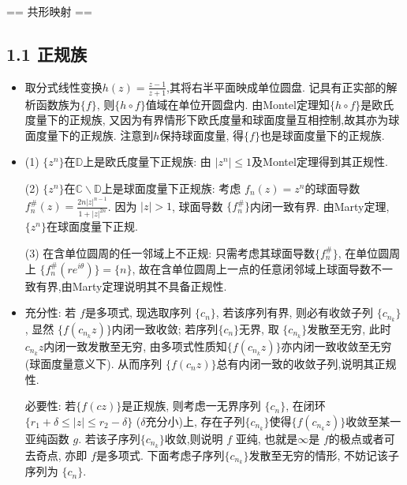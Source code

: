 \renewcommand{\Re}{\operatorname{Re}}
\renewcommand{\Im}{\operatorname{Im}}
\newcommand{\tmod}{\operatorname{mod}}

== 共形映射 ==

\subsection*{1.1 正规族}

\begin{itemize}
    \item[1.1.1]
取分式线性变换$h(z) = \frac{z-1}{z+1}$,其将右半平面映成单位圆盘.
记具有正实部的解析函数族为$\{f\}$, 则$\{h\circ f\}$值域在单位开圆盘内. 
由Montel定理知$\{h\circ f\}$是欧氏度量下的正规族, 
又因为有界情形下欧氏度量和球面度量互相控制,故其亦为球面度量下的正规族.
注意到$h$保持球面度量, 得$\{f\}$也是球面度量下的正规族.


    \item[1.1.2]

(1) $\{z^n\}$在$\mathbb{D}$上是欧氏度量下正规族:
由 $|z^n|\le 1$及Montel定理得到其正规性.

(2) $\{z^n\}$在$\mathbb{C}\backslash \mathbb{D}$上是球面度量下正规族: 
考虑 $f_n(z) = z^n$的球面导数$f^{\#}_{n}(z) = \frac{2n|z|^{n-1}}{1+|z|^{2n}}$. 
因为 $|z|>1$, 球面导数 $\{f^{\#}_n\}$内闭一致有界.
由Marty定理, $\{z^n\}$在球面度量下正规.

 (3) 在含单位圆周的任一邻域上不正规: 只需考虑其球面导数$\{f^{\#}_n\}$, 
 在单位圆周上 $\{f^{\#}_n(re^{i\theta})\}=\{n\}$, 
 故在含单位圆周上一点的任意闭邻域上球面导数不一致有界,由Marty定理说明其不具备正规性.


    \item[1.1.3]

充分性: 若 $f$是多项式, 现选取序列 $\{c_n\}$, 若该序列有界, 
则必有收敛子列 $\{c_{n_k}\}$, 显然 $\{f(c_{n_k}z)\}$内闭一致收敛; 
若序列$\{c_n\}$无界, 取 $\{c_{n_k}\}$发散至无穷, 此时 $c_{n_k}z$内闭一致发散至无穷, 
由多项式性质知$\{f(c_{n_k}z)\}$亦内闭一致收敛至无穷(球面度量意义下). 
从而序列 $\{f(c_n z)\}$总有内闭一致的收敛子列,说明其正规性.

必要性: 若$\{f(c z)\}$是正规族, 则考虑一无界序列 $\{c_n\}$,
在闭环 $\{r_1+\delta\le |z|\le r_2-\delta\}$ ($\delta$充分小)上, 
存在子列$\{c_{n_k}\}$使得$\{f(c_{n_k}z)\}$收敛至某一亚纯函数 $g$.
若该子序列$\{c_{n_k}\}$收敛,则说明 $f$ 亚纯, 也就是$\infty$是 $f$的极点或者可去奇点, 
亦即 $f$是多项式. 
下面考虑子序列$\{c_{n_k}\}$发散至无穷的情形, 不妨记该子序列为 $\{c_n\}$. 


\end{itemize}
